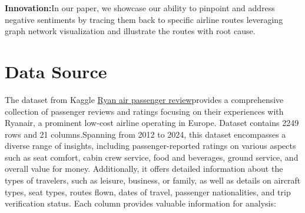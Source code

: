 \documentclass[11pt]{article} %
\begin{document}
\textbf{Innovation:}In our paper, we showcase our ability to pinpoint and address negative sentiments by tracing them back to specific airline routes leveraging graph network visualization and illustrate the routes with root cause.
\section{Data Source}
The dataset from Kaggle \href{https://www.kaggle.com/datasets/cristaliss/ryanair-reviews-ratings?resource=download}{Ryan air passenger review}provides a comprehensive collection of passenger reviews and ratings focusing on their experiences with Ryanair, a prominent low-cost airline operating in Europe. Dataset contains 2249 rows and 21 columns.Spanning from 2012 to 2024, this dataset encompasses a diverse range of insights, including passenger-reported ratings on various aspects such as seat comfort, cabin crew service, food and beverages, ground service, and overall value for money. Additionally, it offers detailed information about the types of travelers, such as leisure, business, or family, as well as details on aircraft types, seat types, routes flown, dates of travel, passenger nationalities, and trip verification status. Each column provides valuable information for analysis:
\end{document}
